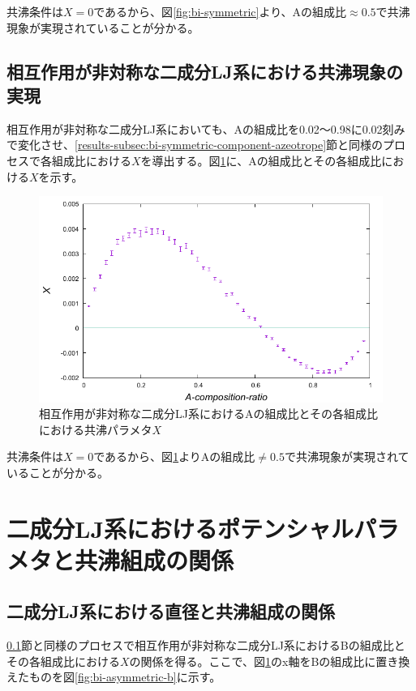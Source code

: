 \documentclass[titlepage]{jsreport}
\begin{document}
共沸条件は$X=0$であるから、図\ref{fig:bi-symmetric}より、Aの組成比$\approx0.5$で共沸現象が実現されていることが分かる。


\subsection{相互作用が非対称な二成分LJ系における共沸現象の実現} \label{results-subsec:bi-asymmetric-component-azeotrope}
相互作用が非対称な二成分LJ系においても、Aの組成比を0.02〜0.98に0.02刻みで変化させ、\ref{results-subsec:bi-symmetric-component-azeotrope}節と同様のプロセスで各組成比における$X$を導出する。図\ref{fig:bi-asymmetric}に、Aの組成比とその各組成比における$X$を示す。

\begin{figure}[htbp]
    \begin{center}
        \includegraphics[width=14cm]{fig/bi-asymmetric/L100T1.0E1.05.pdf}
    \end{center}
    \caption{相互作用が非対称な二成分LJ系におけるAの組成比とその各組成比における共沸パラメタ$X$}
    \label{fig:bi-asymmetric}
\end{figure}

\newpage
共沸条件は$X=0$であるから、図\ref{fig:bi-asymmetric}よりAの組成比$\neq0.5$で共沸現象が実現されていることが分かる。

\newpage
\section{二成分LJ系におけるポテンシャルパラメタと共沸組成の関係} \label{results-sec:bi-component-potential-parameter-azeotrope-ratio}
\subsection{二成分LJ系における直径と共沸組成の関係} \label{results-subsec:bi-component-sigma-azeotrope-ratio}
\ref{results-subsec:bi-asymmetric-component-azeotrope}節と同様のプロセスで相互作用が非対称な二成分LJ系におけるBの組成比とその各組成比における$X$の関係を得る。ここで、図\ref{fig:bi-asymmetric}のx軸をBの組成比に置き換えたものを図\ref{fig:bi-asymmetric-b}に示す。
\end{document}
